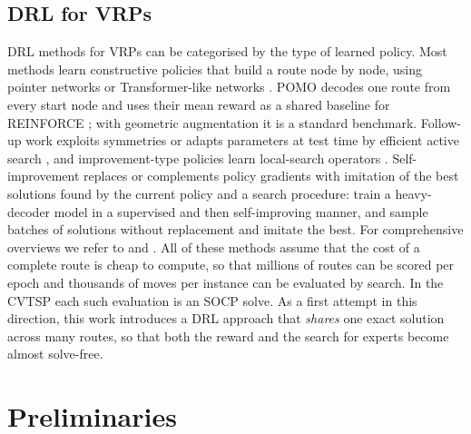 \documentclass[preprint,review,12pt,authoryear]{elsarticle}
\begin{document}
\subsection{DRL for VRPs}
DRL methods for VRPs can be categorised by the type of learned policy. Most methods learn constructive policies
that build a route node by node, using pointer networks \citep{vinyals2015pointer,nazari2018reinforcement} or
Transformer-like networks \citep{kool2019attention,kwon2020pomo}. POMO \citep{kwon2020pomo} decodes one route from
every start node and uses their mean reward as a shared baseline for REINFORCE \citep{williams1992simple}; with
geometric augmentation it is a standard benchmark. Follow-up work exploits symmetries \citep{kim2022symnco} or
adapts parameters at test time by efficient active search \citep{hottung2022efficient}, and improvement-type
policies learn local-search operators \citep{wu2022learning}. Self-improvement replaces or complements policy
gradients with imitation of the best solutions found by the current policy and a search procedure:
\citet{luo2023neural} train a heavy-decoder model in a supervised and then self-improving manner, and
\citet{pirnay2024self} sample batches of solutions without replacement and imitate the best. For comprehensive
overviews we refer to \citet{bengio2021machine} and \citet{mazyavkina2021reinforcement}. All of these methods
assume that the cost of a complete route is cheap to compute, so that millions of routes can be scored per epoch
and thousands of moves per instance can be evaluated by search. In the CVTSP each such evaluation is an SOCP
solve. As a first attempt in this direction, this work introduces a DRL approach that \emph{shares} one exact
solution across many routes, so that both the reward and the search for experts become almost solve-free.

\section{Preliminaries}\label{sec:prelim}
\end{document}
